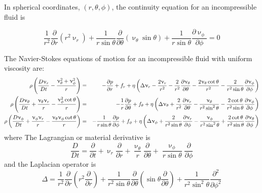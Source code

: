 In spherical coordinates, $(r,\theta,\phi)$, the continuity equation for an incompressible fluid is 
\begin{mdframed}[backgroundcolor=blue!5]
\begin{equation}
\frac{1}{r^2} \frac{\partial}{\partial r} (r^2 \upnu_r) + 
\frac{1}{r \sin \theta} \frac{\partial}{\partial \theta} (\upnu_\theta \sin \theta)+
\frac{1}{r \sin \theta} \frac{\partial \upnu_\phi}{\partial \phi} = 0
\end{equation}
\end{mdframed}

The Navier-Stokes equations of motion for an incompressible fluid with uniform viscosity are:
\begin{eqnarray}
\rho\left( \frac{D\upnu_r}{Dt} - \frac{\upnu_\theta^2+\upnu_\phi^2}{r} \right)
&=&
-\frac{\partial p}{\partial r} + f_r + \eta \left( \Delta \upnu_r - \frac{2\upnu_r}{r^2} 
-\frac{2}{r^2} \frac{\partial \upnu_\theta}{\partial \theta} - \frac{2 \upnu_\theta \cot \theta}{r^2}
-\frac{2}{r^2 \sin\theta} \frac{\partial \upnu_\phi}{\partial \phi}
\right) \nonumber\\
\rho \left(  
\frac{D\upnu_\theta}{Dt} + \frac{\upnu_\theta \upnu_r}{r} - \frac{\upnu^2_\phi \cot \theta}{r}
\right)
&=& 
-\frac{1}{r}\frac{\partial p}{\partial \theta} + f_\theta
+\eta \left(
\Delta \upnu_\theta + \frac{2}{r^2} \frac{\partial \upnu_r}{\partial \theta}
-\frac{\upnu_\theta}{r^2 \sin^2\theta } -\frac{2 \cot \theta}{r^2 \sin\theta}
\frac{\partial \upnu_\phi}{\partial \phi}  
\right) \nonumber\\
\rho \left(  
\frac{D\upnu_\phi}{Dt} + \frac{\upnu_\phi \upnu_r}{r} - \frac{\upnu_\theta \upnu_\phi \cot \theta}{r}
\right)
&=& 
- \frac{1}{r \sin\theta} \frac{\partial p}{\partial \phi} + f_\phi + \eta
\left(
\Delta \upnu_\phi + \frac{2}{r^2 \sin\theta} \frac{\partial \upnu_r}{\partial \phi}
-\frac{\upnu_\phi}{r^2 \sin^2 \theta} + \frac{2 \cot \theta}{r^2 \sin\theta}
\frac{\partial \upnu_\theta}{\partial \phi}
\right) \nonumber\\
\end{eqnarray}
where The Lagrangian or material derivative is
\[
\frac{D}{Dt} = \frac{\partial}{\partial t} 
+ \upnu_r \frac{\partial}{\partial r}  
+ \frac{\upnu_\theta}{r} \frac{\partial}{\partial \theta}
+ \frac{\upnu_\phi}{r \sin\theta} \frac{\partial}{\partial \phi}  
\]
and the Laplacian operator is   
\[
\Delta = \frac{1}{r^2} \frac{\partial }{\partial r}\left( r^2 \frac{\partial }{\partial r}\right)
+\frac{1}{r^2 \sin\theta} \frac{\partial }{\partial \theta}
\left(
\sin\theta \frac{\partial }{\partial\theta}
\right)
+ \frac{1}{r^2 \sin^2\theta} \frac{\partial^2 }{\partial\phi^2}
\]

